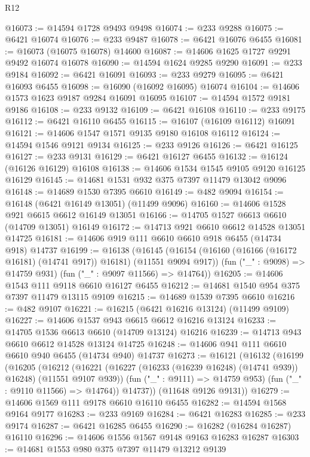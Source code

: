 \begin{lexlean}{R12}
\begin{coremodule}
@16073 := @14594 @1728 @9493 @9498
@16074 := @233 @9288
@16075 := @6421 @16074
@16076 := @233 @9487
@16078 := @6421 @16076 @6455
@16081 := @16073 (@16075 @16078) @14600
@16087 := @14606 @1625 @1727 @9291 @9492 @16074 @16078
@16090 := @14594 @1624 @9285 @9290
@16091 := @233 @9184
@16092 := @6421 @16091
@16093 := @233 @9279
@16095 := @6421 @16093 @6455
@16098 := @16090 (@16092 @16095) @16074
@16104 := @14606 @1573 @1623 @9187 @9284 @16091 @16095
@16107 := @14594 @1572 @9181 @9186
@16108 := @233 @9132
@16109 := @6421 @16108
@16110 := @233 @9175
@16112 := @6421 @16110 @6455
@16115 := @16107 (@16109 @16112) @16091
@16121 := @14606 @1547 @1571 @9135 @9180 @16108 @16112
@16124 := @14594 @1546 @9121 @9134
@16125 := @233 @9126
@16126 := @6421 @16125
@16127 := @233 @9131
@16129 := @6421 @16127 @6455
@16132 := @16124 (@16126 @16129) @16108
@16138 := @14606 @1534 @1545 @9105 @9120 @16125 @16129
@16145 := @14681 @1531 @932 @375 @7397 @11479 @13042 @9096
@16148 := @14689 @1530 @7395 @6610
@16149 := @482 @9094
@16154 := @16148 (@6421 @16149 @13051) (@11499 @9096)
@16160 := @14606 @1528 @921 @6615 @6612 @16149 @13051
@16166 := @14705 @1527 @6613 @6610 (@14709 @13051) @16149
@16172 := @14713 @921 @6610 @6612 @14528 @13051 @14725
@16181 := @14606 @919 @111 @6610 @6610 @918 @6455 (@14734 @918) @14737
@16199 := @16138
    (@16145
      (@16154 (@16160 (@16166 (@16172 @16181) (@14741 @917)) @16181) (@11551 @9094 @917))
      (fun ("_" : @9098) => @14759 @931)
      (fun ("_" : @9097 @11566) => @14764))
@16205 := @14606 @1543 @111 @9118 @6610 @16127 @6455
@16212 := @14681 @1540 @954 @375 @7397 @11479 @13115 @9109
@16215 := @14689 @1539 @7395 @6610
@16216 := @482 @9107
@16221 := @16215 (@6421 @16216 @13124) (@11499 @9109)
@16227 := @14606 @1537 @943 @6615 @6612 @16216 @13124
@16233 := @14705 @1536 @6613 @6610 (@14709 @13124) @16216
@16239 := @14713 @943 @6610 @6612 @14528 @13124 @14725
@16248 := @14606 @941 @111 @6610 @6610 @940 @6455 (@14734 @940) @14737
@16273 := @16121
    (@16132
      (@16199
        (@16205
          (@16212
            (@16221 (@16227 (@16233 (@16239 @16248) (@14741 @939)) @16248) (@11551 @9107 @939))
            (fun ("_" : @9111) => @14759 @953)
            (fun ("_" : @9110 @11566) => @14764))
          @14737))
      (@11648 @9126 @9131))
@16279 := @14606 @1569 @111 @9178 @6610 @16110 @6455
@16282 := @14594 @1568 @9164 @9177
@16283 := @233 @9169
@16284 := @6421 @16283
@16285 := @233 @9174
@16287 := @6421 @16285 @6455
@16290 := @16282 (@16284 @16287) @16110
@16296 := @14606 @1556 @1567 @9148 @9163 @16283 @16287
@16303 := @14681 @1553 @980 @375 @7397 @11479 @13212 @9139

\end{coremodule}
\end{lexlean}
